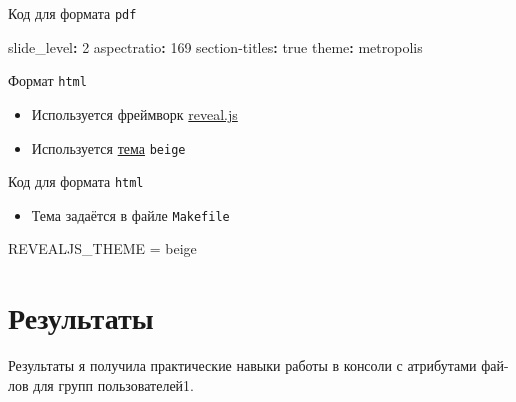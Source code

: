 \documentclass[
  ignorenonframetext,
  aspectratio=169,
]{beamer}
\newenvironment{Shaded}{\begin{snugshade}}{\end{snugshade}}
\newcommand{\AttributeTok}[1]{\textcolor[rgb]{0.40,0.45,0.13}{#1}}
\newcommand{\CharTok}[1]{\textcolor[rgb]{0.13,0.47,0.30}{#1}}
\newcommand{\DecValTok}[1]{\textcolor[rgb]{0.68,0.00,0.00}{#1}}
\newcommand{\FunctionTok}[1]{\textcolor[rgb]{0.28,0.35,0.67}{#1}}
\newcommand{\KeywordTok}[1]{\textcolor[rgb]{0.00,0.23,0.31}{\textbf{#1}}}
\newcommand{\NormalTok}[1]{\textcolor[rgb]{0.00,0.23,0.31}{#1}}
\providecommand{\tightlist}{%
  \setlength{\itemsep}{0pt}\setlength{\parskip}{0pt}}\usepackage{longtable,booktabs,array}
\begin{document}
\begin{frame}[fragile]{Код для формата \texttt{pdf}}
\label{ux43aux43eux434-ux434ux43bux44f-ux444ux43eux440ux43cux430ux442ux430-pdf}
\begin{Shaded}
\begin{Highlighting}[]
\FunctionTok{slide\_level}\KeywordTok{:}\AttributeTok{ }\DecValTok{2}
\FunctionTok{aspectratio}\KeywordTok{:}\AttributeTok{ }\DecValTok{169}
\FunctionTok{section{-}titles}\KeywordTok{:}\AttributeTok{ }\CharTok{true}
\FunctionTok{theme}\KeywordTok{:}\AttributeTok{ metropolis}
\end{Highlighting}
\end{Shaded}
\end{frame}

\begin{frame}[fragile]{Формат \texttt{html}}
\label{ux444ux43eux440ux43cux430ux442-html}
\begin{itemize}[<+->]
\tightlist
\item
  Используется фреймворк \href{https://revealjs.com/}{reveal.js}
\item
  Используется \href{https://revealjs.com/themes/}{тема} \texttt{beige}
\end{itemize}
\end{frame}

\begin{frame}[fragile]{Код для формата \texttt{html}}
\label{ux43aux43eux434-ux434ux43bux44f-ux444ux43eux440ux43cux430ux442ux430-html}
\begin{itemize}[<+->]
\tightlist
\item
  Тема задаётся в файле \texttt{Makefile}
\end{itemize}

\begin{Shaded}
\begin{Highlighting}[]
\NormalTok{REVEALJS\_THEME = beige}
\end{Highlighting}
\end{Shaded}
\end{frame}

\section{Результаты}\label{ux440ux435ux437ux443ux43bux44cux442ux430ux442ux44b}

\begin{frame}{Результаты}
я получила практические навыки работы в консоли с атрибутами фай- лов
для групп пользователей1.
\end{frame}
\end{document}
